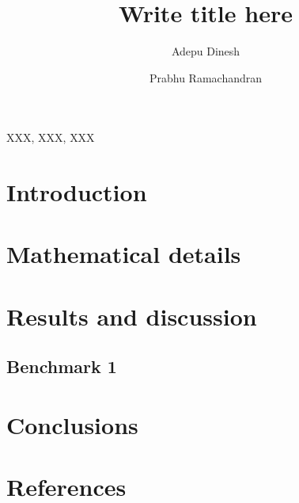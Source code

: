 \documentclass[preprint,12pt]{elsarticle}
\begin{document}
\begin{frontmatter}

  \title{Write title here}
  \author[IITB]{Adepu Dinesh }
   \author[IITB]{Prabhu Ramachandran}
   \address[IITB]{Department of Aerospace
    Engineering, Indian Institute of Technology Bombay, Powai, Mumbai 400076}


\begin{abstract}
\end{abstract}

\begin{keyword}
{XXX}, {XXX}, {XXX}


\end{keyword}

\end{frontmatter}


\section{Introduction}
\label{sec:intro}



\section{Mathematical details}
\label{sec:sph}




\section{Results and discussion}
\label{sec:results}


\subsection{Benchmark 1}
\label{sec:benchmark-1}




\section{Conclusions}
\label{sec:conclusions}


\section*{References}


\end{document}
